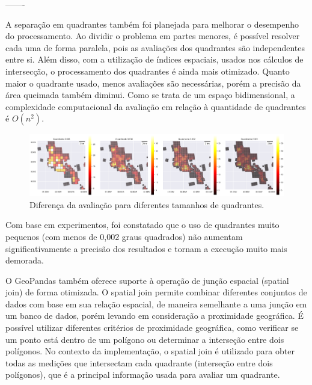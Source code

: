 \documentclass[cic,tc]{iiufrgs}
\begin{document}
-------


A separação em quadrantes também foi planejada para melhorar o desempenho do processamento. Ao dividir o problema em partes menores, é possível resolver cada uma de forma paralela, pois as avaliações dos quadrantes são independentes entre si. Além disso, com a utilização de índices espaciais, usados nos cálculos de intersecção, o processamento dos quadrantes é ainda mais otimizado. Quanto maior o quadrante usado, menos avaliações são necessárias, porém a precisão da área queimada também diminui. Como se trata de um espaço bidimensional, a complexidade computacional da avaliação em relação à quantidade de quadrantes é $O(n^2)$. \par

\begin{figure}[H]
    \caption{Diferença da avaliação para diferentes tamanhos de quadrantes.}
    \begin{center}
        \includegraphics[width=35em]{diferenca_entre_quadrantes}
    \end{center}
    \label{fig:diferenca_entre_quadrantes}
\end{figure}

Com base em experimentos, foi constatado que o uso de quadrantes muito pequenos (com menos de 0,002 graus quadrados) não aumentam significativamente a precisão dos resultados e tornam a execução muito mais demorada.


O GeoPandas também oferece suporte à operação de junção espacial (spatial join) de forma otimizada. O spatial join permite combinar diferentes conjuntos de dados com base em sua relação espacial, de maneira semelhante a uma junção em um banco de dados, porém levando em consideração a proximidade geográfica. É possível utilizar diferentes critérios de proximidade geográfica, como verificar se um ponto está dentro de um polígono ou determinar a interseção entre dois polígonos. No contexto da implementação, o spatial join é utilizado para obter todas as medições que intersectam cada quadrante (interseção entre dois polígonos), que é a principal informação usada para avaliar um quadrante. \par
\end{document}
